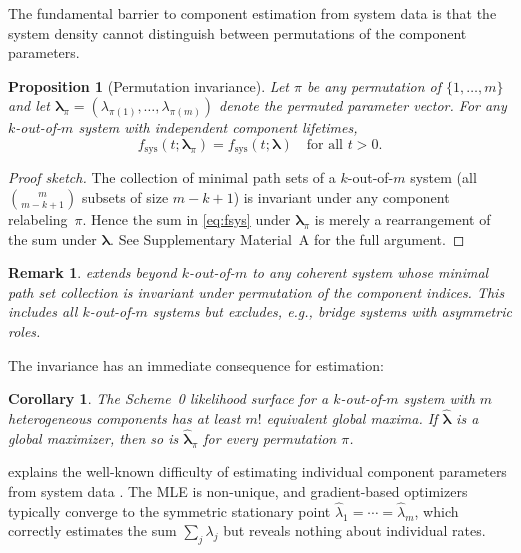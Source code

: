 \documentclass[12pt]{article}
\newtheorem{proposition}{Proposition}
\newtheorem{remark}{Remark}
\newtheorem{corollary}{Corollary}
\newcommand{\fsys}{f_{\mathrm{sys}}}
\newcommand{\blambda}{\boldsymbol{\lambda}}
\begin{document}
The fundamental barrier to component estimation from system data is that the
system density cannot distinguish between permutations of the component
parameters.

\begin{proposition}[Permutation invariance]\label{prop:symmetry}
Let $\pi$ be any permutation of $\{1, \ldots, m\}$ and let $\blambda_\pi =
(\lambda_{\pi(1)}, \ldots, \lambda_{\pi(m)})$ denote the permuted parameter
vector.  For any $k$-out-of-$m$ system with independent component lifetimes,
\begin{equation}\label{eq:symmetry}
  \fsys(t; \blambda_\pi) = \fsys(t; \blambda)
  \quad \text{for all } t > 0.
\end{equation}
\end{proposition}

\begin{proof}[Proof sketch]
The collection of minimal path sets of a $k$-out-of-$m$ system (all
$\binom{m}{m-k+1}$ subsets of size $m-k+1$) is invariant under any
component relabeling~$\pi$.  Hence the sum in \eqref{eq:fsys} under
$\blambda_\pi$ is merely a rearrangement of the sum under $\blambda$.
See Supplementary Material~A for the full argument.
\end{proof}

\begin{remark}
 extends beyond $k$-out-of-$m$ to any coherent system
whose minimal path set collection is invariant under permutation of the
component indices.  This includes all $k$-out-of-$m$ systems but excludes,
e.g., bridge systems with asymmetric roles.
\end{remark}

The invariance has an immediate consequence for estimation:

\begin{corollary}\label{cor:modes}
The Scheme~0 likelihood surface for a $k$-out-of-$m$ system with $m$
heterogeneous components has at least $m!$ equivalent global maxima.  If
$\hat{\blambda}$ is a global maximizer, then so is $\hat{\blambda}_\pi$
for every permutation $\pi$.
\end{corollary}

 explains the well-known difficulty of estimating individual
component parameters from system data \citep{Nowik1990}.  The MLE is
non-unique, and gradient-based optimizers typically converge to the symmetric
stationary point $\hat\lambda_1 = \cdots = \hat\lambda_m$, which correctly
estimates the sum $\sum_j \lambda_j$ but reveals nothing about individual
rates.
\end{document}
